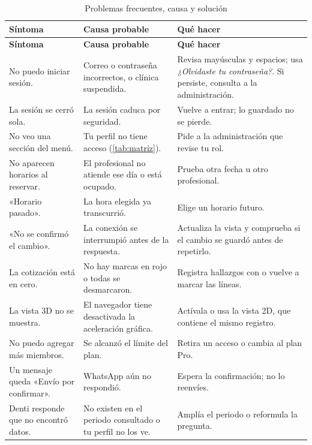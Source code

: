 \documentclass[11pt]{article}
\begin{document}
\begin{longtable}{@{}P{4.6cm}P{4.4cm}P{5.6cm}@{}}
\caption{Problemas frecuentes, causa y solución}\label{tab:problemas}\\
\toprule
\textbf{Síntoma} & \textbf{Causa probable} & \textbf{Qué hacer} \\
\midrule\endfirsthead
\toprule
\textbf{Síntoma} & \textbf{Causa probable} & \textbf{Qué hacer} \\
\midrule\endhead
\small No puedo iniciar sesión. & \small Correo o contraseña incorrectos, o clínica suspendida. & \small Revisa mayúsculas y espacios; usa \textit{¿Olvidaste tu contraseña?}. Si persiste, consulta a la administración. \\
\small La sesión se cerró sola. & \small La sesión caduca por seguridad. & \small Vuelve a entrar; lo guardado no se pierde. \\
\small No veo una sección del menú. & \small Tu perfil no tiene acceso (\cref{tab:matriz}). & \small Pide a la administración que revise tu rol. \\
\small No aparecen horarios al reservar. & \small El profesional no atiende ese día o está ocupado. & \small Prueba otra fecha u otro profesional. \\
\small «Horario pasado». & \small La hora elegida ya transcurrió. & \small Elige un horario futuro. \\
\small «No se confirmó el cambio». & \small La conexión se interrumpió antes de la respuesta. & \small Actualiza la vista y comprueba si el cambio se guardó antes de repetirlo. \\
\small La cotización está en cero. & \small No hay marcas en rojo o todas se desmarcaron. & \small Registra hallazgos con  o vuelve a marcar las líneas. \\
\small La vista 3D no se muestra. & \small El navegador tiene desactivada la aceleración gráfica. & \small Actívala o usa la vista 2D, que contiene el mismo registro. \\
\small No puedo agregar más miembros. & \small Se alcanzó el límite del plan. & \small Retira un acceso o cambia al plan Pro. \\
\small Un mensaje queda «Envío por confirmar». & \small WhatsApp aún no respondió. & \small Espera la confirmación; no lo reenvíes. \\
\small Denti responde que no encontró datos. & \small No existen en el periodo consultado o tu perfil no los ve. & \small Amplía el periodo o reformula la pregunta. \\
\bottomrule
\end{longtable}
\end{document}

